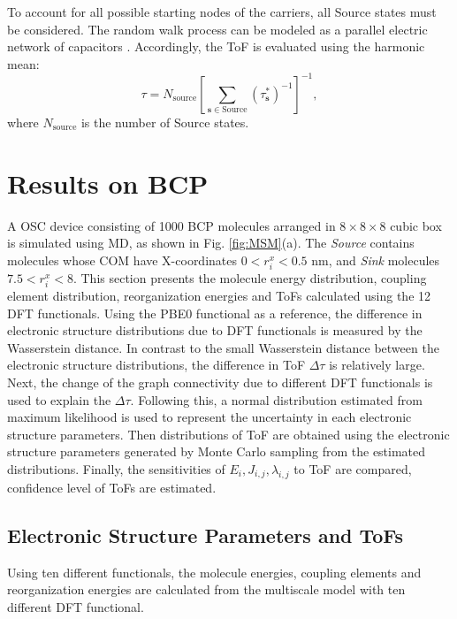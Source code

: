 \documentclass[letterpaper,12pt]{article}
\begin{document}
To account for all possible starting nodes of the carriers, all Source states must be considered. The random walk process can be modeled as a parallel electric network of capacitors \cite{doyle_random_2000}. Accordingly, the ToF is evaluated using the harmonic mean:
\begin{equation} 
\tau = N_\text{source} \left[\sum_{\mathbf{s} \in \text{Source}} (\tau_\mathbf{s}^\ast)^{-1}\right]^{-1},
\label{eq:ToF}
\end{equation}
where $N_\text{source}$ is the number of Source states.

\section{Results on BCP}
\label{sec:result}

A OSC device consisting of 1000 BCP molecules arranged in $8 \times 8 \times 8$ cubic box is simulated using MD, as shown in Fig. \ref{fig:MSM}(a).
The \textit{Source} contains molecules whose COM have X-coordinates $0 < r^x_i < 0.5$ nm, and \textit{Sink} molecules $7.5 < r^x_i < 8$. 
This section presents the molecule energy distribution, coupling element distribution, reorganization energies and ToFs calculated using the 12 DFT functionals. 
Using the PBE0 functional as a reference, the difference in electronic structure distributions due to DFT functionals is measured by the Wasserstein distance. In contrast to the small Wasserstein distance between the electronic structure distributions, the difference in ToF $\Delta \tau$ is relatively large. 
Next, the change of the graph connectivity due to different DFT functionals is used to explain the $\Delta \tau$.
Following this, a normal distribution estimated from maximum likelihood is used to represent the uncertainty in each electronic structure parameters. Then distributions of ToF are obtained using the electronic structure parameters generated by Monte Carlo sampling from the estimated distributions. Finally, the sensitivities of $E_i,J_{i,j},\lambda_{i,j}$ to ToF are compared, confidence level of ToFs are estimated. 

\subsection{Electronic Structure Parameters and ToFs}
Using ten different functionals, the molecule energies, coupling elements and reorganization energies are calculated from the multiscale model with ten different DFT functional.
\end{document}
